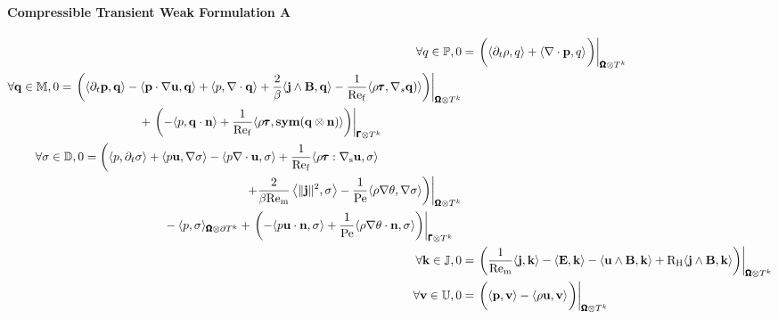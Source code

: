     \paragraph*{Compressible Transient Weak Formulation A}
    \begin{align}
        \forall q \in \bbP,  0  &=  \left.\left(\langle\partial_{t}\rho, q\rangle + \langle\nabla\cdot\bfp, q\rangle\tall\right)\right|_{\bfOmega\otimes T^{k}}  \\
        \begin{split}
            \forall \bfq \in \bbM,  0  &=  \left.\left(\langle\partial_{t}\bfp, \bfq\rangle - \langle\bfp\cdot\nabla\bfu, \bfq\rangle + \langle p, \nabla\cdot\bfq\rangle + \frac{2}{\beta}\langle\bfj\wedge\bfB, \bfq\rangle - \frac{1}{\rmRef}\langle\rho\bftau, \nabla_{s}\bfq)\rangle\right)\right|_{\bfOmega\otimes T^{k}}  \\
            &\;\;\;\;\;\;\;\;\;\;\;\;\;\;\;\;\;\;\;\;\;\;\;\;  + \left.\left(- \langle p, \bfq\cdot\bfn\rangle + \frac{1}{\rmRef}\langle\rho\bftau, \sym(\bfq\otimes\bfn)\rangle\right)\right|_{\bfGamma\otimes T^{k}}
        \end{split}  \\
        \begin{split}
            \forall \sigma \in \bbD,  0  &=  \left(\langle p, \partial_{t}\sigma\rangle + \langle p\bfu, \nabla\sigma\rangle - \langle p\nabla\cdot\bfu, \sigma\rangle + \frac{1}{\rmRef}\langle\rho\bftau:\nabla_{\rms}\bfu, \sigma\rangle\right.  \\
            &\;\;\;\;\;\;\;\;\;\;\;\;\;\;\;\;\;\;\;\;\;\;\;\;\;\;\;\;\;\;\;\;\;\;\;\;\;\;\;\;\;\;\;\;\;\;\;\;\left.\left.+ \frac{2}{\beta\rmRem}\left\langle\|\bfj\|^{2}, \sigma\right\rangle - \frac{1}{\rmPe}\langle\rho\nabla\theta, \nabla\sigma\rangle\right)\right|_{\bfOmega\otimes T^{k}}  \\
            &\;\;\;\;\;\;\;\;\;\;\;\;\;\;\;\;\;\;\;\;\;\;\;\;- \langle p, \sigma\rangle_{\bfOmega\otimes\partial T^{k}} + \left.\left(- \langle p\bfu\cdot\bfn, \sigma\rangle + \frac{1}{\rmPe}\langle\rho\nabla\theta\cdot\bfn, \sigma\rangle\right)\right|_{\bfGamma\otimes T^{k}}
        \end{split}  \\
        \forall \bfk \in \bbJ,  0  &=  \left.\left(\frac{1}{\rmRem}\langle\bfj, \bfk\rangle - \langle\bfE, \bfk\rangle - \langle\bfu\wedge\bfB, \bfk\rangle + \rmRH\langle\bfj\wedge\bfB, \bfk\rangle\right)\right|_{\bfOmega\otimes T^{k}}  \\
        \forall \bfv \in \bbU,  0  &=  \left.\left(\langle\bfp, \bfv\rangle - \langle\rho\bfu, \bfv\rangle\tall\right)\right|_{\bfOmega\otimes T^{k}}  \\

\end{align}
